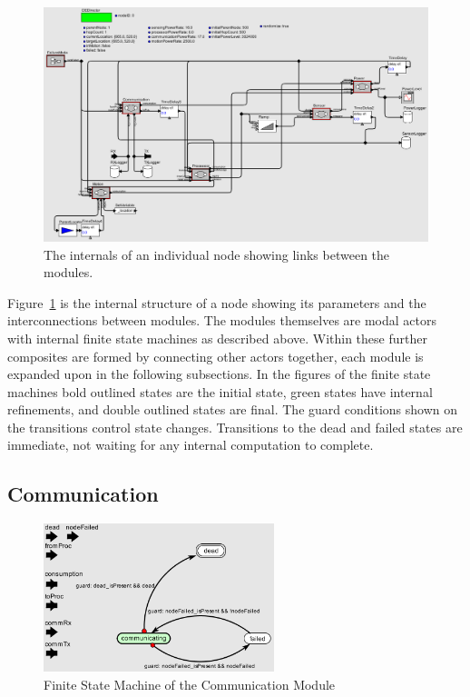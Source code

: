 \documentclass[authoryearcitations]{UoYCSproject}
\begin{document}
\begin{figure}
 \centering
    \includegraphics[width=\textwidth]{figures/Node.png}
    \caption{The internals of an individual node showing links between the modules.}
    \label{fig:node}
\end{figure}

Figure~\ref{fig:node} is the internal structure of a node showing its parameters and the interconnections between modules. The modules themselves are modal actors with internal finite state machines as described above. Within these further composites are formed by connecting other actors together, each module is expanded upon in the following subsections. In the figures of the finite state machines bold outlined states are the initial state, green states have internal refinements, and double outlined states are final. The guard conditions shown on the transitions control state changes. Transitions to the dead and failed states are immediate, not waiting for any internal computation to complete.

\subsection{Communication}

\begin{figure}
 \centering
    \includegraphics[width=0.6\textwidth]{figures/communication_Controller.png}
    \caption{Finite State Machine of the Communication Module}
    \label{fig:commControl}
\end{figure}
\end{document}
